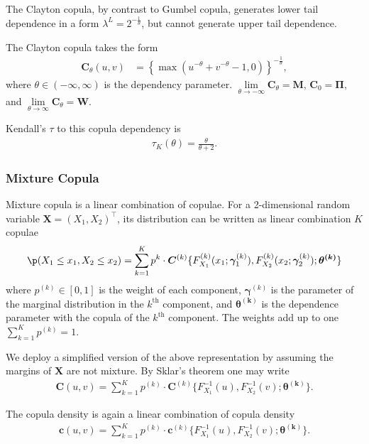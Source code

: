 The Clayton copula, by contrast to Gumbel copula,
generates lower tail dependence in a form $\lambda^L = 2^{-\frac{1}{\theta}}$,
but cannot generate upper tail dependence.\medskip

The Clayton copula takes the form
\begin{align}
    \bm{C}_{\theta}(u,v) &= \left\{
    \max(u^{-\theta}+v^{-\theta}-1,0)\right\}^{-\frac{1}{\theta}},
    \end{align}
where $\theta \in (-\infty, \infty)$ is the dependency parameter.
$\lim\limits_{\theta \to -\infty} \bm{C}_\theta = \bm{M}$, $\bm{C}_0 = \bm{\Pi}$, and $\lim\limits_{\theta \to \infty} \bm{C}_\theta = \bm{W}$.\medskip

Kendall's $\tau$ to this copula dependency is 
\begin{align}
    \tau_K(\theta) =\frac{\theta}{\theta+2}.
    \end{align}\medskip

\subsubsection{Mixture Copula}\label{sec:mixture-copula}
Mixture copula is a linear combination of copulae. 
For a 2-dimensional random variable $\bm{X}=(X_1,X_2)^\top$,
its distribution can be written as linear combination $K$ copulae
\begin{align}
    \p(X_1 \leq x_1, X_2 \leq x_2) = \sum_{k=1}^K p^k \cdot \bm{C}^{(k)}\{F^{(k)}_{X_1}(x_1;\bm{\gamma}^{(k)}_1),
    F^{(k)}_{X_2}(x_2;\bm{\gamma}^{(k)}_2); \bm{\theta^{(k)}}\}
    \end{align}
where $p^{(k)} \in [0,1]$ is the weight of each component,
$\bm{\gamma}^{(k)}$ is the parameter of the marginal distribution in the $k^\text{th}$ component,
and $\bm{\theta^{(k)}}$ is the dependence parameter with the copula of the $k^\text{th}$ component.
The weights add up to one $\sum_{k=1}^K p^{(k)}=1$. \medskip

We deploy a simplified version of the above representation by assuming the margins of $\bm{X}$ are not mixture.
By Sklar's theorem one may write
\begin{align}
    \bm{C}(u,v)= \sum_{k=1}^K p^{(k)} \cdot \bm{C}^{(k)}\{F^{-1}_{X_1}(u),
    F^{-1}_{X_2}(v); \bm{\theta^{(k)}}\}.
    \end{align}\medskip

The copula density is again a linear combination of copula density
\begin{align}
    \bm{c}(u,v)= \sum_{k=1}^K p^{(k)} \cdot \bm{c}^{(k)}\{F^{-1}_{X_1}(u),
    F^{-1}_{X_2}(v); \bm{\theta^{(k)}}\}.
    \end{align}\medskip

